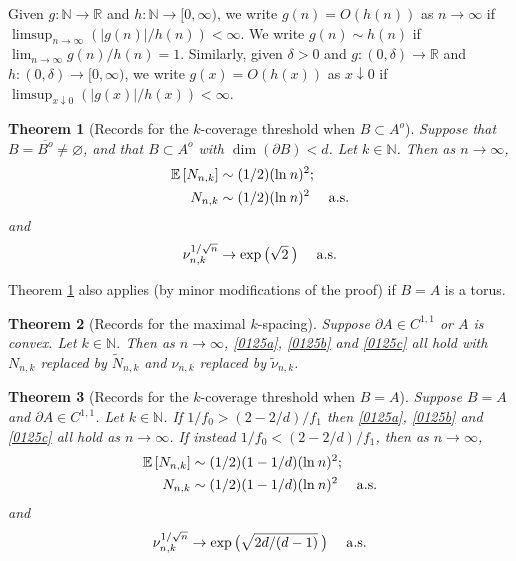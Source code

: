 \documentclass[12pt]{article}
\newcommand{\N}{\mathbb{N}}
\newcommand{\E}{\mathbb E \,}
\renewcommand{\emptyset}{\varnothing}
\newcommand{\tN}{{\tilde{N}}}
\newcommand{\tnu}{{\tilde{\nu}}}
\newcommand{\R}{\mathbb{R}}
\renewcommand{\log}{{\ln \:}}
\newtheorem{theo}{Theorem}
\begin{document}
	Given $g: \N \to \R$ and $h: \N \to [0,\infty)$,
	we write $g(n) = O(h(n))$ as $n \to \infty$ if
	$\limsup_{n \to \infty} (|g(n)|/h(n)) < \infty$.
	We write $g(n) \sim h(n)$ if $\lim_{n \to \infty} g(n)/h(n)=1$.
	Similarly, given $\delta >0$ and $g: (0,\delta) \to \R$
	and $h: (0,\delta) \to [0,\infty)$, 
	we write $g(x) = O(h(x))$ as $x \downarrow 0$ if
	$\limsup_{x \downarrow 0 } (|g(x)|/h(x)) < \infty$.



\begin{theo}[Records for the $k$-coverage threshold when $B \subset A^o$]
\label{t:record}
	Suppose that $B = \overline{B^o} \neq \emptyset $,
	and that  $B \subset  A^o$ with $\dim(\partial B) < d $.
Let $k \in \N$.
  Then as $n \to \infty$,
	\begin{align}
		\E[N_{n,k}] & \sim (1/2) (\log n )^2;
\label{0125a}
\\
		N_{n,k} & \sim  (1/2) (\log n )^2
~~~~{\rm a.s.}
\label{0125b}
	\end{align} 
and 
	\begin{align}
	\nu_{n,k}^{1/\sqrt{n}} \to \exp \big( \sqrt{2} \: \big)   
~~~~{\rm a.s.}
\label{0125c}
		\end{align}
\end{theo}
Theorem \ref{t:record} also applies (by minor modifications of the proof)
if $B=A$ is a torus.
\begin{theo}[Records for the maximal $k$-spacing]
	\label{Thm2}
	Suppose  $\partial A \in C^{1,1}$ or $A$ is convex.
	Let $k \in \N$.
	Then as $n \to \infty$,
	\eqref{0125a}, \eqref{0125b} and \eqref{0125c} all hold
	with
	$N_{n,k}$ replaced by $\tN_{n,k}$
	and $\nu_{n,k}$ replaced by $\tnu_{n,k}$.
\end{theo}
\begin{theo}[Records for the $k$-coverage threshold when $B = A$]
	\label{Thm3}
	Suppose $B=A$ and $\partial A \in C^{1,1}$.
	Let $k  \in \N$.
	If $1/f_0 > (2-2/d)/f_1$ 
	then \eqref{0125a}, \eqref{0125b} 
	and \eqref{0125c} all  hold as $n \to \infty$. If instead
	 $1/f_0 < (2-2/d)/f_1$, then  as $n \to \infty$,
	\begin{align}
		\E[N_{n,k}] & \sim (1/2) (1-1/d)(\log n )^2;
\label{0720a}
\\
		N_{n,k} & \sim (1/2) (1-1/d) (\log n )^2
~~~~{\rm a.s.}
\label{0720b}
	\end{align}
and %
	\begin{align}
	\nu_{n,k}^{1/\sqrt{n}} \to \exp \big( \sqrt{2 d/(d-1)}  \: \big)   
~~~~{\rm a.s.}
\label{0720c}
	\end{align}
\end{theo}
\end{document}
